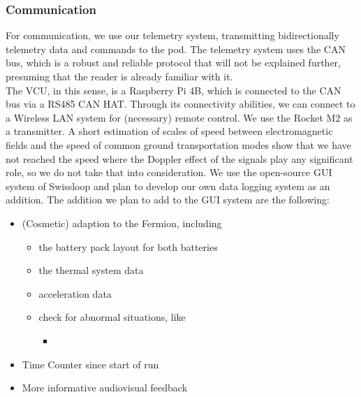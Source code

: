 \subsubsection*{Communication}
For communication, we use our telemetry system, transmitting bidirectionally telemetry data and commands to the pod. The telemetry system uses the CAN bus, which is a robust and reliable protocol that will not be explained further, presuming that the reader is already familiar with it. \\
The VCU, in this sense, is a Raspberry Pi 4B, which is connected to the CAN bus via a RS485 CAN HAT. 
Through its connectivity abilities, we can connect to a Wireless LAN system for (necessary) remote control. We use the Rocket M2 as a transmitter. A short estimation of scales of speed between electromagnetic fields and the speed of common ground transportation modes show that we have not reached the speed where the Doppler effect of the signals play any significant role, so we do not take that into consideration. We use the open-source GUI system of Swissloop and plan to develop our own data logging system as an addition. The addition we plan to add to the GUI system are the following:
\begin{itemize}
    \item (Cosmetic) adaption to the Fermion, including \begin{itemize}
        \item the battery pack layout for both batteries
        \item the thermal system data
        \item acceleration data
        \item check for abnormal situations, like \begin{itemize}
            \item 
        \end{itemize}
    \end{itemize}
    \item Time Counter since start of run
    \item More informative audiovisual feedback
\end{itemize} 

